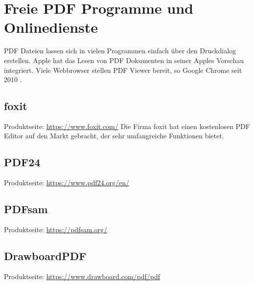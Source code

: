 \section{Freie PDF Programme und Onlinedienste}
PDF Dateien lassen sich in vielen Programmen einfach über den Druckdialog erstellen. Apple hat das Lesen von PDF Dokumenten in seiner Apples Vorschau integriert. Viele Webbrowser stellen PDF Viewer bereit, so Google Chrome seit 2010 \cite{wiki-pdf-de}.

\subsection{foxit}
Produktseite: \url{https://www.foxit.com/}
Die Firma foxit hat einen kostenlosen PDF Editor auf den Markt gebracht, der sehr umfangreiche Funktionen bietet.

\subsection{PDF24}
Produktseite: \url{https://www.pdf24.org/en/}

\subsection{PDFsam}
Produktseite: \url{https://pdfsam.org/}

\subsection{DrawboardPDF}
Produktseite: \url{https://www.drawboard.com/pdf/pdf}

